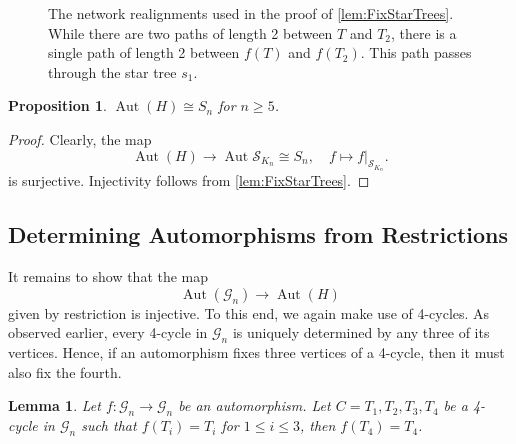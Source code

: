 \documentclass[reqno,dvipsnames]{amsart}
\theoremstyle{plain}
\newtheorem{lemma}[theorem]{Lemma}
\newtheorem{proposition}[theorem]{Proposition}
\numberwithin{equation}{section}
\theoremstyle{definition}
\DeclareMathOperator{\Aut}{Aut}
\begin{document}
\begin{figure}[tbp]
			\vspace{-3mm}
			\caption{The network realignments used in the proof of \autoref{lem:FixStarTrees}. While there are two paths of length 2 between $T$ and $T_2$, there is a single path of length 2 between $f(T)$ and $f(T_2)$. This path passes through the star tree $s_1$.}
			\label{fig:IdentityContradiction}
		\end{figure}

		\begin{proposition} \label{prop:RigidSubcomplex}
			$\Aut(H) \cong S_n$ for $n\geq 5$.
		\end{proposition}

		\begin{proof}
			Clearly, the map
			\[
				\Aut(H) \to \Aut \mathcal{S}_{K_n} \cong S_n, \quad f\mapsto f|_{\mathcal{S}_{K_n}}.
			\]
			is surjective. Injectivity follows from \autoref{lem:FixStarTrees}.
		\end{proof}



	\subsection{Determining Automorphisms from Restrictions}

		It remains to show that the map
		\[
			\Aut(\mathcal{G}_n) \to \Aut(H)
		\]
		given by restriction is injective. To this end, we again make use of 4-cycles. As observed earlier, every 4-cycle in $\mathcal{G}_n$ is uniquely determined by any three of its vertices. Hence, if an automorphism fixes three vertices of a 4-cycle, then it must also fix the fourth.

		\begin{lemma} \label{lem:FourCycleExtension}
			Let $f: \mathcal{G}_n \to \mathcal{G}_n$ be an automorphism. Let $C = T_1,T_2,T_3,T_4$ be a 4-cycle in $\mathcal{G}_n$ such that $f(T_i) = T_i$ for $1\leq i\leq 3$, then $f(T_4) = T_4$. 
		\end{lemma}
\end{document}
